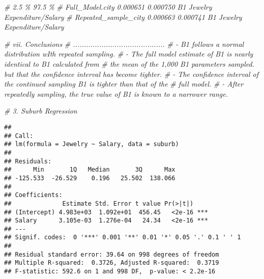 \documentclass[
]{article}
\newenvironment{Shaded}{\begin{snugshade}}{\end{snugshade}}
\newcommand{\CommentTok}[1]{\textcolor[rgb]{0.56,0.35,0.01}{\textit{#1}}}
\newcommand{\FunctionTok}[1]{\textcolor[rgb]{0.00,0.00,0.00}{#1}}
\newcommand{\NormalTok}[1]{#1}
\newcommand{\OtherTok}[1]{\textcolor[rgb]{0.56,0.35,0.01}{#1}}
\newcommand{\SpecialCharTok}[1]{\textcolor[rgb]{0.00,0.00,0.00}{#1}}
\begin{document}
\begin{Shaded}
\begin{Highlighting}[]
    \CommentTok{\#                           2.5 \%           97.5 \%}
    \CommentTok{\# Full\_Model.city       0.000651        0.000750    B1 Jewelry Expenditure/Salary}
    \CommentTok{\# Repeated\_sample\_city  0.000663        0.000741    B1 Jewelry Expenditure/Salary}


\CommentTok{\# vii. Conclusions}
\CommentTok{\# ..........................................}
    \CommentTok{\# {-} B1 follows a normal distribution wIth repeated sampling. }
    \CommentTok{\# {-} The full model  estimate of B1 is nearly identical to B1 calculated from}
    \CommentTok{\#   the mean of the 1,000 B1 parameters sampled. but that the confidence interval has become tighter. }
    \CommentTok{\# {-} The confidence interval of the continued sampling B1 is tighter than that of the}
    \CommentTok{\#   full model. }
    \CommentTok{\# {-} After repeatedly sampling, the true value of B1 is known to a narrower range.}
\end{Highlighting}
\end{Shaded}

\begin{Shaded}
\begin{Highlighting}[]
\CommentTok{\# 3. Suburb Regression}
\end{Highlighting}
\end{Shaded}

\begin{Shaded}
\end{Shaded}

\begin{verbatim}
## 
## Call:
## lm(formula = Jewelry ~ Salary, data = suburb)
## 
## Residuals:
##      Min       1Q   Median       3Q      Max 
## -125.533  -26.529    0.196   25.502  138.066 
## 
## Coefficients:
##              Estimate Std. Error t value Pr(>|t|)    
## (Intercept) 4.983e+03  1.092e+01  456.45   <2e-16 ***
## Salary      3.105e-03  1.276e-04   24.34   <2e-16 ***
## ---
## Signif. codes:  0 '***' 0.001 '**' 0.01 '*' 0.05 '.' 0.1 ' ' 1
## 
## Residual standard error: 39.64 on 998 degrees of freedom
## Multiple R-squared:  0.3726, Adjusted R-squared:  0.3719 
## F-statistic: 592.6 on 1 and 998 DF,  p-value: < 2.2e-16
\end{verbatim}
\end{document}
